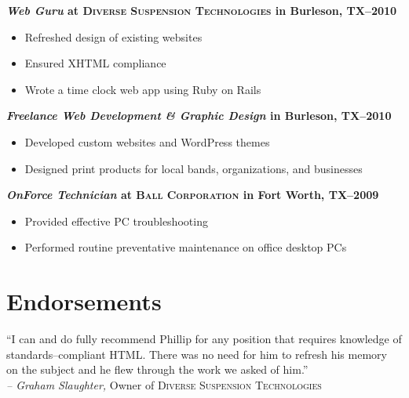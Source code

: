 \documentclass[margin]{res}
\newcommand{\sectionspace}{\vspace{8pt}}
\begin{document}
\begin{resume}
                \textbf{\textit{Web Guru}
                 at \textsc{Diverse Suspension Technologies} in Burleson, TX--2010}
                 \vspace{-10pt}\begin{itemize} \itemsep -2pt %
                   \item Refreshed design of existing websites
                   \item Ensured XHTML compliance
                   \item Wrote a time clock web app using Ruby on Rails
                \end{itemize}

                \textbf{\textit{Freelance Web Development \textrm{\&} Graphic Design}
                in Burleson, TX--2010}
                \vspace{-10pt}\begin{itemize} \itemsep -2pt %
                  \item Developed custom websites and WordPress themes
                  \item Designed print products for local bands, organizations, and businesses
                \end{itemize}

                \textbf{\textit{OnForce Technician}
                at \textsc{Ball Corporation} in Fort Worth, TX--2009}
                \vspace{-10pt}\begin{itemize} \itemsep -2pt %
                  \item Provided effective PC troubleshooting
                  \item Performed routine preventative maintenance on office desktop PCs
                \end{itemize}

\sectionspace


\section{\textsf{Endorsements}}

                ``I can and do fully recommend Phillip for any position that requires
                knowledge of standards--compliant HTML. There was no need for him to refresh his
                memory on the subject and he flew through the work we asked of him.''             \\
                \textit{-- Graham Slaughter,} Owner of \textsc{Diverse Suspension Technologies}


\end{resume}
\end{document}
